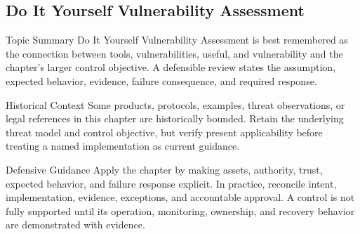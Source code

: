 \documentclass[11pt,letterpaper]{article}
\begin{document}
\subsection*{Do It Yourself Vulnerability Assessment}
\begin{CornellNotesTable}
\end{CornellNotesTable}
\begin{CornellSummaryBox}{Topic Summary}
Do It Yourself Vulnerability Assessment is best remembered as the connection between tools, vulnerabilities, useful, and vulnerability and the chapter's larger control objective. A defensible review states the assumption, expected behavior, evidence, failure consequence, and required response.
\end{CornellSummaryBox}
\begin{CornellWarningBox}{Historical Context}
Some products, protocols, examples, threat observations, or legal references in this chapter are historically bounded. Retain the underlying threat model and control objective, but verify present applicability before treating a named implementation as current guidance.
\end{CornellWarningBox}
\begin{CornellOverviewBox}{Defensive Guidance}
Apply the chapter by making assets, authority, trust, expected behavior, and failure response explicit. In practice, reconcile intent, implementation, evidence, exceptions, and accountable approval. A control is not fully supported until its operation, monitoring, ownership, and recovery behavior are demonstrated with evidence.
\end{CornellOverviewBox}
\end{document}
